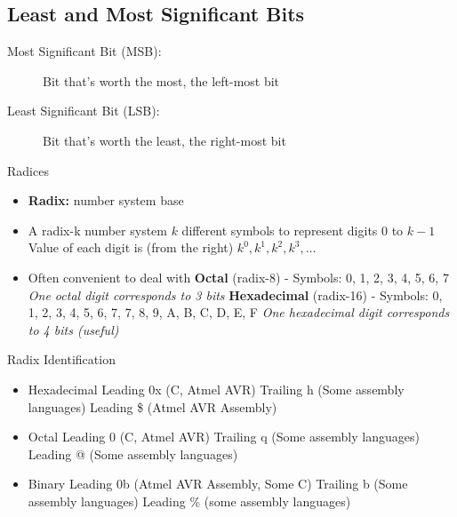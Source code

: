 \subsection{Least and Most Significant Bits}
\begin{description}
	\item[Most Significant Bit (MSB):] Bit that's worth the most, the left-most bit
	\item[Least Significant Bit (LSB):] Bit that's worth the least, the right-most bit
\end{description}

\begin{note}{Radices}
	\begin{itemize}
		\item \textbf{Radix:} number system base
		\item A radix-k number system
		\subitem $k$ different symbols to represent digits 0 to $k-1$
		\subitem Value of each digit is (from the right) $k^0, k^1, k^2, k^3, \ldots$
		\item Often convenient to deal with
		\subitem\textbf{Octal} (radix-8) - Symbols: 0, 1, 2, 3, 4, 5, 6, 7
		\subsubitem\textit{One octal digit corresponds to 3 bits}
		\subitem\textbf{Hexadecimal} (radix-16) - Symbols: 0, 1, 2, 3, 4, 5, 6, 7, 7, 8, 9, A, B, C, D, E, F
		\subsubitem\textit{One hexadecimal digit corresponds to 4 bits (useful)}
	\end{itemize}
\end{note}

\begin{note}{Radix Identification}
	\begin{itemize}
		\item Hexadecimal
		\subitem Leading 0x (C, Atmel AVR)
		\subitem Trailing h (Some assembly languages)
		\subitem Leading \$ (Atmel AVR Assembly)
		
		\item Octal
		\subitem Leading 0 (C, Atmel AVR)
		\subitem Trailing q (Some assembly languages)
		\subitem Leading @ (Some assembly languages)
		
		\item Binary
		\subitem Leading 0b (Atmel AVR Assembly, Some C)
		\subitem Trailing b (Some assembly languages)
		\subitem Leading \% (some assembly languages)
	\end{itemize}
\end{note}